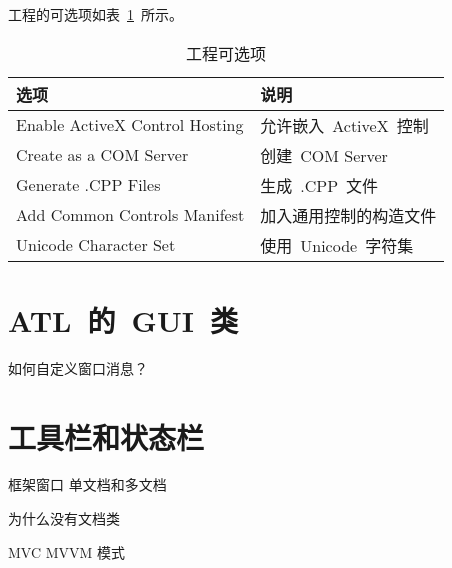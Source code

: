 工程的可选项如表~\ref{tab:setup:option}~所示。
\begin{table}[h]
  \centering
  \caption{工程可选项}\label{tab:setup:option}
\begin{tabular}{|l|l|}
  \hline
  \textbf{选项} & \textbf{说明} \\
  \hline\hline
  Enable ActiveX Control Hosting
  & 允许嵌入~ActiveX~控制 \\
  \hline
  Create as a COM Server & 创建~COM Server \\
  \hline
  Generate .CPP Files & 生成~.CPP~文件 \\
  \hline
  Add Common Controls Manifest
  & 加入通用控制的构造文件 \\
  \hline
  Unicode Character Set & 使用~Unicode~字符集 \\
  \hline
\end{tabular}

\end{table}

\section{ATL~的~GUI~类}


如何自定义窗口消息？

\section{工具栏和状态栏}

框架窗口
单文档和多文档

为什么没有文档类

MVC MVVM 模式




